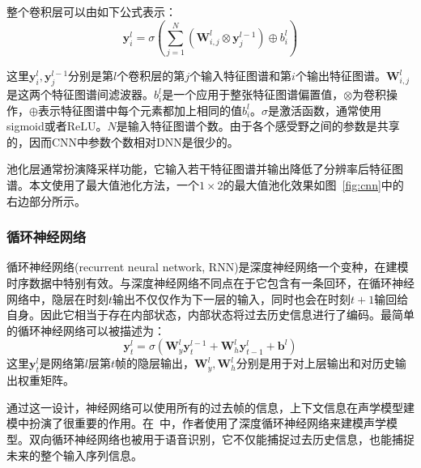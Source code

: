 整个卷积层可以由如下公式表示：
\begin{equation}
    \mathbf{y}^{l}_{i} = \sigma ( \sum_{j=1}^{N} ( \mathbf{W}^{l}_{i,j} \otimes \mathbf{y}^{l-1}_{j} ) \oplus b^{l}_{i} )
\end{equation}

这里$\mathbf{y}^{l}_i, \mathbf{y}^{l-1}_j$分别是第$l$个卷积层的第$j$个输入特征图谱和第$i$个输出特征图谱。$\mathbf{W}^l_{i,j}$是这两个特征图谱间滤波器。$b^l_i$是一个应用于整张特征图谱偏置值，$\otimes$为卷积操作，$\oplus$表示特征图谱中每个元素都加上相同的值$b^l_i$。$\sigma$是激活函数，通常使用sigmoid或者ReLU。$N$是输入特征图谱个数。由于各个感受野之间的参数是共享的，因而CNN中参数个数相对DNN是很少的。

池化层通常扮演降采样功能，它输入若干特征图谱并输出降低了分辨率后特征图谱。本文使用了最大值池化方法，一个$1 \times 2$的最大值池化效果如图~\ref{fig:cnn}中的右边部分所示。

\subsubsection{循环神经网络}
循环神经网络(recurrent neural network, RNN)是深度神经网络一个变种，在建模时序数据中特别有效。与深度神经网络不同点在于它包含有一条回环，在循环神经网络中，隐层在时刻$t$输出不仅仅作为下一层的输入，同时也会在时刻$t+1$输回给自身。因此它相当于存在内部状态，内部状态将过去历史信息进行了编码。最简单的循环神经网络可以被描述为：
\begin{equation}
    \mathbf{y}^l_t = \sigma(\mathbf{W}^l_y \mathbf{y}^{l-1}_t + \mathbf{W}^l_h \mathbf{y}^l_{t-1} + \mathbf{b}^l)
\end{equation}
这里$\mathbf{y}^l_t$是网络第$l$层第$t$帧的隐层输出，$\mathbf{W}^l_y, \mathbf{W}^l_h$分别是用于对上层输出和对历史输出权重矩阵。

通过这一设计，神经网络可以使用所有的过去帧的信息，上下文信息在声学模型建模中扮演了很重要的作用。在~\cite{graves2013hybrid,graves2013speech,sak2014long,sak2014sequence}中，作者使用了深度循环神经网络来建模声学模型。双向循环神经网络也被用于语音识别，它不仅能捕捉过去历史信息，也能捕捉未来的整个输入序列信息。

